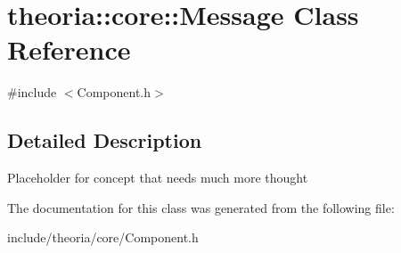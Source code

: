 \hypertarget{classtheoria_1_1core_1_1Message}{\section{theoria\+:\+:core\+:\+:Message Class Reference}
\label{classtheoria_1_1core_1_1Message}
}


{\ttfamily \#include $<$Component.\+h$>$}



\subsection{Detailed Description}
Placeholder for concept that needs much more thought 

The documentation for this class was generated from the following file\+:\begin{DoxyCompactItemize}
\item 
include/theoria/core/Component.\+h\end{DoxyCompactItemize}
